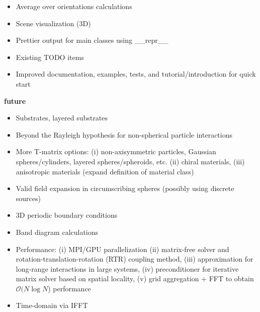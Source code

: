 \documentclass[11pt]{article}
\begin{document}
\begin{enumerate*}
\begin{itemize}[label={\tiny\raisebox{1ex}{\textbullet}}]
            \item Average over orientations calculations
            \item Scene visualization (3D)
            \item Prettier output for main classes using \_\_repr\_\_
            \item Existing TODO items
            \item Improved documentation, examples, tests, and tutorial/introduction for quick start
        \end{itemize}
    \item \textbf{future}
        \begin{itemize}[label={\tiny\raisebox{1ex}{\textbullet}}]
            \item Substrates, layered substrates
            \item Beyond the Rayleigh hypothesis for non-spherical particle interactions
            \item More T-matrix options:
                        (i) non-axisymmetric particles, Gaussian spheres/cylinders, layered spheres/spheroids, etc.
                        (ii) chiral materials,
                        (iii) anisotropic materials (expand definition of material class)
                    \item Valid field expansion in circumscribing spheres (possibly using discrete sources)
            \item 3D periodic boundary conditions
            \item Band diagram calculations
            \item Performance:
                      (i) MPI/GPU parallelization
                      (ii) matrix-free solver and rotation-translation-rotation (RTR) coupling method,
                      (iii) approximation for long-range interactions in large systems,
                      (iv) preconditioner for iterative matrix solver based on spatial locality,
                      (v) grid aggregation + FFT to obtain $\mathcal{O}(N \log N$) performance
            \item Time-domain via IFFT
        \end{itemize}
\end{enumerate*}
\end{document}
